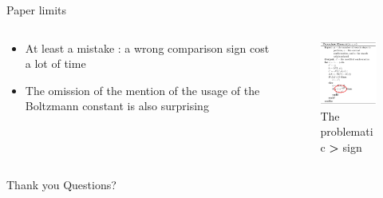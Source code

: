 \documentclass[presentation]{beamer}
\begin{document}
\begin{frame}[label={sec:orge851777}]{Paper limits}
\begin{columns}
\begin{column}{.3\columnwidth}
\begin{itemize}
\item At least a mistake : a wrong comparison sign cost a lot of time
\item The omission of the mention of the usage of the Boltzmann constant is also surprising
\end{itemize}
\end{column}
\begin{column}{.6\columnwidth}
\begin{figure}[htbp]
\centering
\includegraphics[width=170px]{./figure_red.png}
\caption{\label{fig:cls}The problematic \textbf{>} sign}
\end{figure}
\end{column}
\end{columns}
\end{frame}

\begin{frame}[label={sec:orgd12fa27}]{Thank you}
\huge{\center Questions?}
\end{frame}
\end{document}

